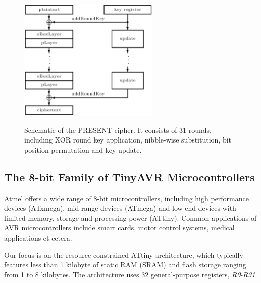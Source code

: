 \documentclass[11pt]{llncs2e} %
\begin{document}
\begin{figure}[H]
	\label{present_schematic}
	\centering
	 \includegraphics [width=0.6\textwidth]{present.eps}
	 \\
\caption{\footnotesize Schematic of the PRESENT cipher. It consists of 31 rounds, including XOR round key application, nibble-wise substitution, bit position permutation and key update.}
\end{figure}
\subsection{The 8-bit Family of TinyAVR Microcontrollers}
Atmel offers a wide range of 8-bit microcontrollers, including high performance devices (ATxmega), mid-range devices (ATmega) and low-end devices with limited memory, storage and processing power (ATtiny). Common applications of AVR microcontrollers include smart cards, motor control systems, medical applications et cetera. 

Our focus is on the resource-constrained ATtiny architecture, which typically features less than 1 kilobyte of static RAM (SRAM) and flash storage ranging from 1 to 8 kilobytes. The architecture uses 32 general-purpose registers, \textit{R0}-\textit{R31}.
\end{document}
